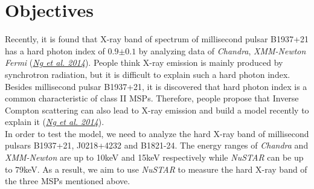 \documentclass[12pt]{report}
\begin{document}
    \section{Objectives}
    Recently, it is found that X-ray band of spectrum of millisecond pulsar B1937+21 has a hard photon 
    index of $0.9\mathrm{\pm}0.1$ by analyzing data of \textit{Chandra}, \textit{XMM-Newton} \textit{Fermi} 
    (\href{https://arxiv.org/pdf/1110.1271.pdf}{\textit{Ng et al. 2014}}).
    People think X-ray emission
    is mainly produced by synchrotron radiation, but it is difficult to explain such a hard photon index. 
    Besides millisecond pulsar B1937+21, it is discovered that hard photon index is a common characteristic 
    of class II MSPs. Therefore, people propose that Inverse Compton scattering can also lead to X-ray 
    emission and build a model recently to explain it (\href{https://arxiv.org/pdf/1110.1271.pdf}
    {\textit{Ng et al. 2014}}). \\
    \indent 
    In order to test the model, we need to analyze the hard X-ray band of millisecond pulsars B1937+21, 
    J0218+4232 and B1821-24. The energy ranges of \textit{Chandra} and \textit{XMM-Newton} are up to 10keV 
    and 15keV respectively while \textit{NuSTAR} can be up to 79keV. As a result, we aim to use
    \textit{NuSTAR} to measure the hard X-ray band of the three MSPs mentioned above. 



              
\end{document}
